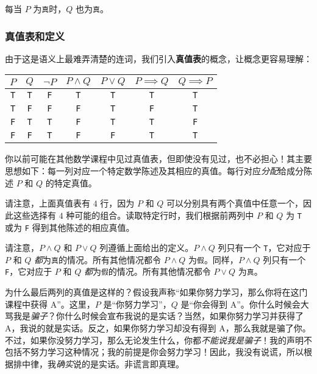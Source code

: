 \begin{center}
    每当 $P$ 为\verb|真|时，$Q$ 也为\verb|真|。
\end{center}

\subsubsection*{真值表和定义}

由于这是语义上最难弄清楚的连词，我们引入\textbf{真值表}的概念，让概念更容易理解：
\begin{center}
    \begin{tabular}{c|c|c|c|c|c|c}
          $P$      & $Q$      & $\neg P$ & $P \land Q$ &  $P \lor Q$ & $P \implies Q$ & $Q \implies P$\\
          \hline
          \verb|T| & \verb|T| & \verb|F| &   \verb|T|  &  \verb|T|   &    \verb|T|    & \verb|T|\\
          \verb|T| & \verb|F| & \verb|F| &   \verb|F|  &  \verb|T|   &    \verb|F|    & \verb|T|\\
          \verb|F| & \verb|T| & \verb|T| &   \verb|F|  &  \verb|T|   &    \verb|T|    & \verb|F|\\
          \verb|F| & \verb|F| & \verb|T| &   \verb|F|  &  \verb|F|   &    \verb|T|    & \verb|T|\\
    \end{tabular}
\end{center}
你以前可能在其他数学课程中见过真值表，但即使没有见过，也不必担心！其主要思想如下：每一列对应一个特定数学陈述及其相应的真值。每行对应\emph{分配}给成分陈述 $P$ 和 $Q$ 的特定真值。

请注意，上面真值表有 $4$ 行，因为 $P$ 和 $Q$ 可以分别具有两个真值中任意一个，因此这些选择有 $4$ 种可能的组合。读取特定行时，我们根据前两列中 $P$ 和 $Q$ 为 \verb|T| 或为 \verb|F| 得到其他陈述的相应真值。

请注意，$P \land Q$ 和 $P \lor Q$ 列遵循上面给出的定义。$P \land Q$ 列只有一个 \verb|T|，它对应于 $P$ 和 $Q$ \emph{都}为\verb|真|的情况。所有其他情况都令 $P \land Q$ 为\verb|假|。同样，$P \land Q$ 列只有一个 \verb|F|，它对应于 $P$ 和 $Q$ \emph{都}为\verb|假|的情况。所有其他情况都令 $P \lor Q$ 为\verb|真|。

为什么最后两列的真值是这样的？假设我声称``如果你努力学习，那么你将在这门课程中获得 A''。这里，$P$ 是``你努力学习''，$Q$ 是``你会得到 A''。你什么时候会大骂我是\emph{骗子}？你什么时候会宣布我说的是实话？当然，如果你努力学习并获得了 A，我说的就是实话。反之，如果你努力学习却没有得到 A，那么我就是骗了你。不过，如果你没努力学习，那么无论发生什么，你都\emph{不能说我是骗子}！我的声明不包括不努力学习这种情况；我的前提是你会努力学习！因此，我没有说谎，所以根据排中律，我\emph{确实}说的是实话。非谎言即真理。

